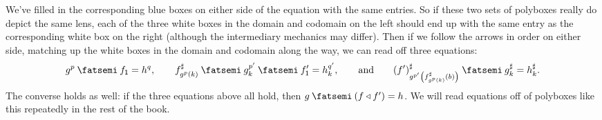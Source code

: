 \documentclass[Book-Poly]{subfiles}
\begin{document}
We've filled in the corresponding blue boxes on either side of the equation with the same entries.
So if these two sets of polyboxes really do depict the same lens, each of the three white boxes in the domain and codomain on the left should end up with the same entry as the corresponding white box on the right (although the intermediary mechanics may differ).
Then if we follow the arrows in order on either side, matching up the white boxes in the domain and codomain along the way, we can read off three equations:
\[
    g^p\then f_\1 = h^q, \qquad f^\sharp_{g^p(k)}\then g^{p'}_k\then f'_\1 = h^{q'}_k, \qqand (f')^\sharp_{g^{p'}\left(f^\sharp_{g^p(k)}(b)\right)}\then g^\sharp_k = h^\sharp_k.
\]
The converse holds as well: if the three equations above all hold, then $g\then(f\tri f')=h$.
We will read equations off of polyboxes like this repeatedly in the rest of the book.%
\end{document}
